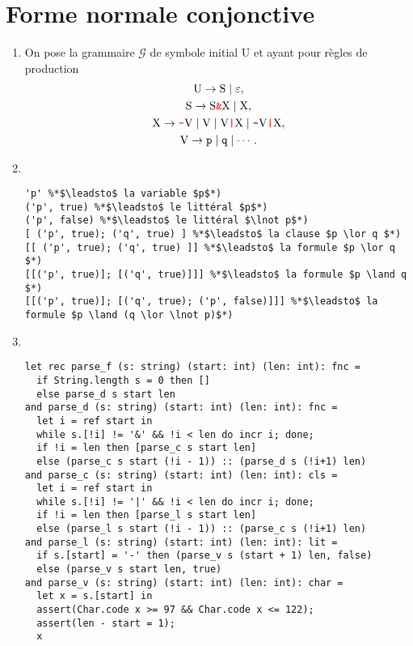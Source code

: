 \section{Forme normale conjonctive}

\begin{enumerate}
	\item On pose la grammaire $\mathcal{G}$ de symbole initial $\mathrm{U}$ et ayant pour règles de production 
		\begin{gather*}
			\mathrm{U} \to \mathrm{S}  \mid \varepsilon,\\
			\mathrm{S} \to \mathrm{S}\texttt{{\color{red}\&}}\mathrm{X}  \mid \mathrm{X},\\
			\mathrm{X} \to \texttt{{\color{red}-}}\mathrm{V}  \mid \mathrm{V}  \mid \mathrm{V}\texttt{{\color{red}|}}\mathrm{X} \mid \texttt{-}\mathrm{V}\texttt{{\color{red}|}}\mathrm{X},\\
			\mathrm{V} \to \texttt{p}  \mid \texttt{q}  \mid \cdots.
		\end{gather*}
	\item~\\
		\begin{lstlisting}[language=caml,caption=Expressions \textsc{OCaml}, xleftmargin=.05\textwidth, xrightmargin=.05\textwidth,
]
'p' %*$\leadsto$ la variable $p$*)
('p', true) %*$\leadsto$ le littéral $p$*)
('p', false) %*$\leadsto$ le littéral $\lnot p$*)
[ ('p', true); ('q', true) ] %*$\leadsto$ la clause $p \lor q $*)
[[ ('p', true); ('q', true) ]] %*$\leadsto$ la formule $p \lor q $*)
[[('p', true)]; [('q', true)]]] %*$\leadsto$ la formule $p \land q $*)
[[('p', true)]; [('q', true); ('p', false)]]] %*$\leadsto$ la formule $p \land (q \lor \lnot p)$*)
		\end{lstlisting}
	\item~\\
		\begin{lstlisting}[language=caml,caption=Parsing des fonctions \textsc{OCaml}]
let rec parse_f (s: string) (start: int) (len: int): fnc =
  if String.length s = 0 then []
  else parse_d s start len
and parse_d (s: string) (start: int) (len: int): fnc =
  let i = ref start in
  while s.[!i] != '&' && !i < len do incr i; done;
  if !i = len then [parse_c s start len]
  else (parse_c s start (!i - 1)) :: (parse_d s (!i+1) len)
and parse_c (s: string) (start: int) (len: int): cls =
  let i = ref start in
  while s.[!i] != '|' && !i < len do incr i; done;
  if !i = len then [parse_l s start len]
  else (parse_l s start (!i - 1)) :: (parse_c s (!i+1) len)
and parse_l (s: string) (start: int) (len: int): lit =
  if s.[start] = '-' then (parse_v s (start + 1) len, false)
  else (parse_v s start len, true)
and parse_v (s: string) (start: int) (len: int): char =
  let x = s.[start] in
  assert(Char.code x >= 97 && Char.code x <= 122);
  assert(len - start = 1);
  x
		\end{lstlisting}
\end{enumerate}
